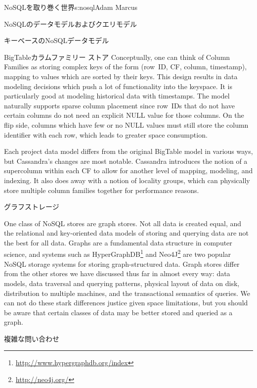 \begin{aosachapter}{NoSQLを取り巻く世界}{s:nosql}{Adam Marcus}
\begin{aosasect1}{NoSQLのデータモデルおよびクエリモデル}
\begin{aosasect2}{キーベースのNoSQLデータモデル}
\begin{aosasect3}{BigTableカラムファミリー ストア}
Conceptually, one can think of Column Families as storing complex keys
of the form (row~ID, CF, column, timestamp), mapping to values which
are sorted by their keys.  This design results in data modeling
decisions which push a lot of functionality into the keyspace.  It is
particularly good at modeling historical data with timestamps.  The
model naturally supports sparse column placement since row~IDs that do
not have certain columns do not need an explicit NULL value for those
columns.  On the flip side, columns which have few or no NULL values
must still store the column identifier with each row, which leads to
greater space consumption.

Each project data model differs from the original BigTable model in
various ways, but Cassandra's changes are most notable.  Cassandra
introduces the notion of a supercolumn within each CF to allow for
another level of mapping, modeling, and indexing.  It also does away
with a notion of locality groups, which can physically store multiple
column families together for performance reasons.

\end{aosasect3}

\end{aosasect2}

\begin{aosasect2}{グラフストレージ}

One class of NoSQL stores are graph stores.  Not all data is created
equal, and the relational and key-oriented data models of storing and
querying data are not the best for all data.  Graphs are a fundamental
data structure in computer science, and systems such as HyperGraphDB\footnote{\url{http://www.hypergraphdb.org/index}}
and Neo4J\footnote{\url{http://neo4j.org/}} are two popular NoSQL storage systems for storing
graph-structured data.  Graph stores differ from the other stores we
have discussed thus far in almost every way: data models, data
traversal and querying patterns, physical layout of data on disk,
distribution to multiple machines, and the transactional semantics of
queries.  We can not do these stark differences justice given space
limitations, but you should be aware that certain classes of data may
be better stored and queried as a graph.

\end{aosasect2}

\begin{aosasect2}{複雑な問い合わせ}


\end{aosasect2}
\end{aosasect1}
\end{aosachapter}
